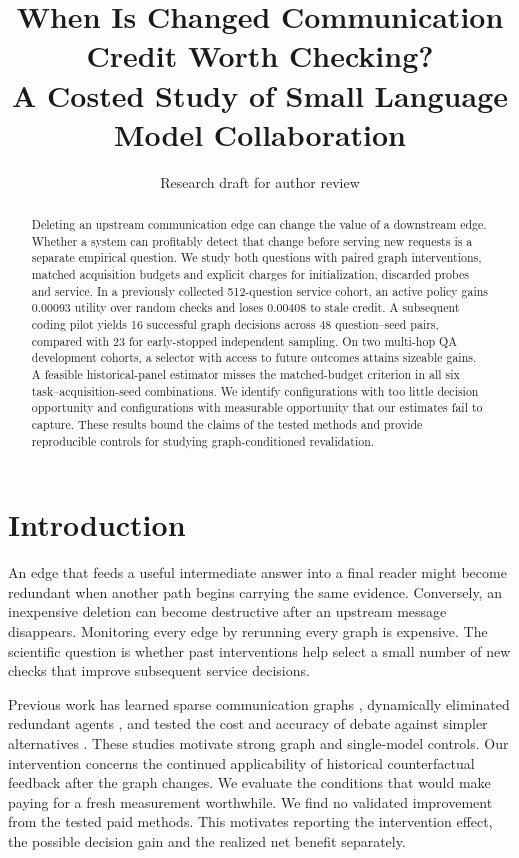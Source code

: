 \documentclass[11pt]{article}
\title{When Is Changed Communication Credit Worth Checking?\\A Costed Study of Small Language Model Collaboration}
\author{Research draft for author review}
\begin{document}
\maketitle
\begin{abstract}
Deleting an upstream communication edge can change the value of a downstream edge. Whether a system can profitably detect that change before serving new requests is a separate empirical question. We study both questions with paired graph interventions, matched acquisition budgets and explicit charges for initialization, discarded probes and service. In a previously collected 512-question service cohort, an active policy gains 0.00093 utility over random checks and loses 0.00408 to stale credit. A subsequent coding pilot yields 16 successful graph decisions across 48 question--seed pairs, compared with 23 for early-stopped independent sampling. On two multi-hop QA development cohorts, a selector with access to future outcomes attains sizeable gains. A feasible historical-panel estimator misses the matched-budget criterion in all six task--acquisition-seed combinations. We identify configurations with too little decision opportunity and configurations with measurable opportunity that our estimates fail to capture. These results bound the claims of the tested methods and provide reproducible controls for studying graph-conditioned revalidation.
\end{abstract}

\section{Introduction}
An edge that feeds a useful intermediate answer into a final reader might become redundant when another path begins carrying the same evidence. Conversely, an inexpensive deletion can become destructive after an upstream message disappears. Monitoring every edge by rerunning every graph is expensive. The scientific question is whether past interventions help select a small number of new checks that improve subsequent service decisions.

Previous work has learned sparse communication graphs \citep{agentprune}, dynamically eliminated redundant agents \citep{agentdropout}, and tested the cost and accuracy of debate against simpler alternatives \citep{smit}. These studies motivate strong graph and single-model controls. Our intervention concerns the continued applicability of historical counterfactual feedback after the graph changes. We evaluate the conditions that would make paying for a fresh measurement worthwhile. We find no validated improvement from the tested paid methods. This motivates reporting the intervention effect, the possible decision gain and the realized net benefit separately.
\end{document}
